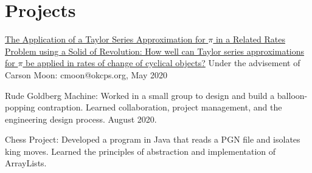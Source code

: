 \documentclass[12pt]{article}
\begin{document}
%

\section*{Projects}
\href{https://github.com/tttnguyen729/ee}{The Application of a Taylor Series Approximation for \(\pi\) in a Related Rates Problem using a Solid of Revolution: How well can Taylor series approximations for \(\pi\) be applied in rates of change of cyclical objects?} Under the advisement of Carson Moon: cmoon@okcps.org, May 2020 

Rude Goldberg Machine: Worked in a small group to design and build a balloon-popping contraption. Learned collaboration, project management, and the engineering design process. August 2020.

Chess Project: Developed a program in Java that reads a PGN file and isolates king moves. Learned the principles of abstraction and implementation of ArrayLists.


\end{document}
